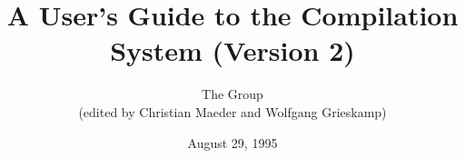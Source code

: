 \author{The \opal{} Group \\
 (edited by Christian Maeder and Wolfgang Grieskamp)}

\title{A User's Guide to the \opal{} Compilation System (Version 2)}
\date{August 29, 1995}




\maketitle
\tableofcontents





